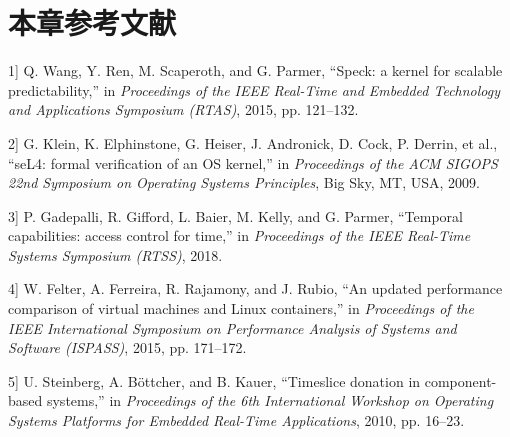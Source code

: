 \section{本章参考文献}\label{sec:4-chapter-bibliography}

\protect{}\label{cite:4-1}

\noindent {[}1{]} Q. Wang, Y. Ren, M. Scaperoth, and G. Parmer, ``Speck: a kernel for scalable predictability,'' in \textit{Proceedings of the IEEE Real-Time and Embedded Technology and Applications Symposium (RTAS)}, 2015, pp. 121--132.

\protect{}\label{cite:4-2}

\noindent {[}2{]} G. Klein, K. Elphinstone, G. Heiser, J. Andronick, D. Cock, P. Derrin, et al., ``seL4: formal verification of an OS kernel,'' in \textit{Proceedings of the ACM SIGOPS 22nd Symposium on Operating Systems Principles}, Big Sky, MT, USA, 2009.

\protect{}\label{cite:4-3}

\noindent {[}3{]} P. Gadepalli, R. Gifford, L. Baier, M. Kelly, and G. Parmer, ``Temporal capabilities: access control for time,'' in \textit{Proceedings of the IEEE Real-Time Systems Symposium (RTSS)}, 2018.

\protect{}\label{cite:4-4}

\noindent {[}4{]} W. Felter, A. Ferreira, R. Rajamony, and J. Rubio, ``An updated performance comparison of virtual machines and Linux containers,'' in \textit{Proceedings of the IEEE International Symposium on Performance Analysis of Systems and Software (ISPASS)}, 2015, pp. 171--172.

\protect{}\label{cite:4-5}

\noindent {[}5{]} U. Steinberg, A. B{\"o}ttcher, and B. Kauer, ``Timeslice donation in component-based systems,'' in \textit{Proceedings of the 6th International Workshop on Operating Systems Platforms for Embedded Real-Time Applications}, 2010, pp. 16--23.

